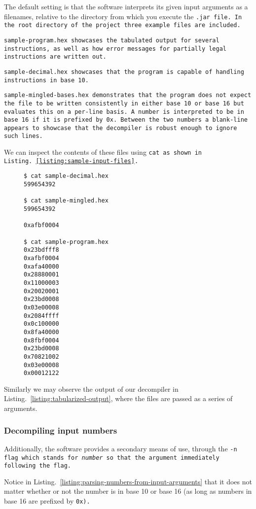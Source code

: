 The default setting is that the software interprets its given input
arguments as a filenames, relative to the directory from which you
execute the \tt{.jar} file. In the root directory of the project three
example files are included.

\tt{sample-program.hex} showcases the tabulated output for several
instructions, as well as how error messages for partially legal
instructions are written out.

\tt{sample-decimal.hex} showcases that the program is capable
of handling instructions in base 10. 

\tt{sample-mingled-bases.hex} demonstrates that the program does not
expect the file to be written consistently in either base 10 or base
16 but evaluates this on a per-line basis. A number is interpreted to
be in base 16 if it is prefixed by \tt{0x}. Between the two numbers
a blank-line appears to showcase that the decompiler is robust
enough to ignore such lines.

We can inspect the contents of these files using \tt{cat}
as shown in Listing.~\ref{listing:sample-input-files}.

\begin{figure}
\begin{lstlisting}[style=plain,
    caption=Sample input files,
    label=listing:sample-input-files]
$ cat sample-decimal.hex 
599654392

$ cat sample-mingled.hex
599654392

0xafbf0004

$ cat sample-program.hex
0x23bdfff8
0xafbf0004
0xafa40000
0x28880001
0x11000003
0x20020001
0x23bd0008
0x03e00008
0x2084ffff
0x0c100000
0x8fa40000
0x8fbf0004
0x23bd0008
0x70821002
0x03e00008
0x00012122
\end{lstlisting}
\end{figure}

Similarly we may observe the output of our decompiler in
Listing.~\ref{listing:tabularized-output}, where the
files are passed as a series of arguments.

\subsubsection{Decompiling input numbers}

Additionally, the software provides a secondary means of use, through
the \tt{-n} flag which stands for \emph{number} so that the argument
immediately following the flag.

Notice in Listing.~\ref{listing:parsing-numbers-from-input-arguments}
that it does not matter whether or not the number is in base 10 or
base 16 (as long as numbers in base 16 are prefixed by \tt{0x}).

